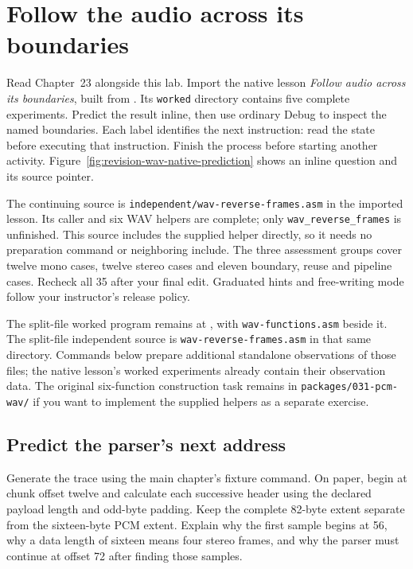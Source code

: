 \chapter{Follow the audio across its boundaries}
\label{revision-lab:wav}

Read Chapter~23 alongside this lab. Import the native lesson
\emph{Follow audio across its boundaries}, built from
. Its \texttt{worked} directory contains
five complete experiments. Predict the result inline, then use ordinary Debug
to inspect the named boundaries. Each label identifies the next instruction:
read the state before executing that instruction. Finish the process before
starting another activity. Figure~\ref{fig:revision-wav-native-prediction}
shows an inline question and its source pointer.

The continuing source is \texttt{independent/wav-reverse-frames.asm} in the
imported lesson. Its caller and six WAV helpers are complete; only
\texttt{wav\_reverse\_frames} is unfinished. This source includes the supplied
helper directly, so it needs no preparation command or neighboring include.
The three assessment groups cover twelve mono cases, twelve stereo cases and
eleven boundary, reuse and pipeline cases. Recheck all 35 after your final edit.
Graduated hints and free-writing mode follow your instructor's release policy.

The split-file worked program remains at
, with
\texttt{wav-functions.asm} beside it. The split-file independent source is
\texttt{wav-reverse-frames.asm} in that same directory. Commands below prepare
additional standalone observations of those files; the native lesson's worked
experiments already contain their observation data. The original six-function
construction task remains in \texttt{packages/031-pcm-wav/} if you want to
implement the supplied helpers as a separate exercise.



\section{Predict the parser's next address}

Generate the trace using the main chapter's fixture command. On paper, begin
at chunk offset twelve and calculate each successive header using the declared
payload length and odd-byte padding. Keep the complete 82-byte extent separate
from the sixteen-byte PCM extent. Explain why the first sample begins at 56,
why a data length of sixteen means four stereo frames, and why the parser must
continue at offset 72 after finding those samples.

